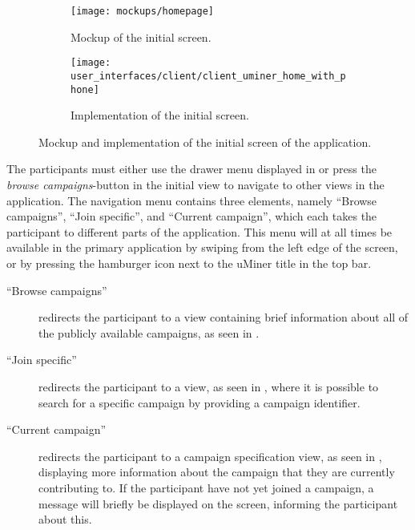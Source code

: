 \begin{figure}[!htbp]
    \begin{subfigure}[!t]{.48\textwidth}
        \centering
        \texttt{[image: mockups/homepage]}
        \caption{Mockup of the initial screen.}
        \label{fig:mockup_initial_screen}
    \end{subfigure}%
    \begin{subfigure}[!t]{.52\textwidth}
    \centering
        \texttt{[image: user\_interfaces/client/client\_uminer\_home\_with\_phone]}
        \caption{Implementation of the initial screen.}
        \label{fig:implementation_initial_screen}
    \end{subfigure}
    \caption{Mockup and implementation of the initial screen of the application.}
    \label{fig:initial_screen}
\end{figure}
\FloatBarrier

The participants must either use the drawer menu displayed in  or press the \emph{browse campaigns}-button in the initial view to navigate to other views in the application. The navigation menu contains three elements, namely ``Browse campaigns'', ``Join specific'', and ``Current campaign'', which each takes the participant to different parts of the application. This menu will at all times be available in the primary application by swiping from the left edge of the screen, or by pressing the hamburger icon next to the uMiner title in the top bar. 

\begin{description}
    \item[``Browse campaigns''] redirects the participant to a view containing brief information about all of the publicly available campaigns, as seen in .

    \item[``Join specific''] redirects the participant to a view, as seen in , where it is possible to search for a specific campaign by providing a campaign identifier.

    \item[``Current campaign''] redirects the participant to a campaign specification view, as seen in , displaying more information about the campaign that they are currently contributing to. If the participant have not yet joined a campaign, a message will briefly be displayed on the screen, informing the participant about this.
\end{description}

